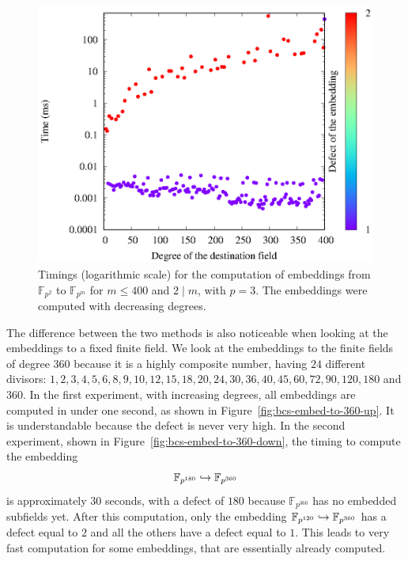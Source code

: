 \begin{figure}
  \centering
  \includegraphics{benchmarks/lattice-bcs/embed-from-2-down-3.eps}
  \caption{Timings (logarithmic scale) for the computation of embeddings from
    $\mathbb{F}_{p^{2}}$ to $\mathbb{F}_{p^{m}}$ for $m\leq 400$ and $2\mid m$,
  with $p=3$. The embeddings were computed with decreasing degrees.}
  \label{fig:bcs-embed-from-2-down}
\end{figure}
The difference between the two methods is also noticeable when looking at the
embeddings to a fixed finite field. We look at the embeddings to the finite
fields of degree $360$ because it is a highly composite number, having $24$
different divisors: $1, 2, 3, 4, 5, 6, 8, 9, 10, 12, 15, 18, 20, 24, 30, 36, 40,
45, 60, 72, 90, 120, 180$ and $360$. In the first experiment, with increasing
degrees, all embeddings are computed in under one second, as shown in
Figure~\ref{fig:bcs-embed-to-360-up}. It is understandable because the defect is
never very high. In the second experiment, shown in
Figure~\ref{fig:bcs-embed-to-360-down}, the timing to compute the embedding 
\[
  \mathbb{F}_{p^{180}}\hookrightarrow\mathbb{F}_{p^{360}}
\]
is approximately $30$ seconds, with a defect of $180$ because
$\mathbb{F}_{p^{360}}$ has no embedded subfields yet. After this computation,
only the embedding $\mathbb{F}_{p^{120}}\hookrightarrow\mathbb{F}_{p^{360}}$ has a defect
equal to $2$ and all the others have a defect equal to $1$. This leads to very
fast computation for some embeddings, that are essentially already computed.
